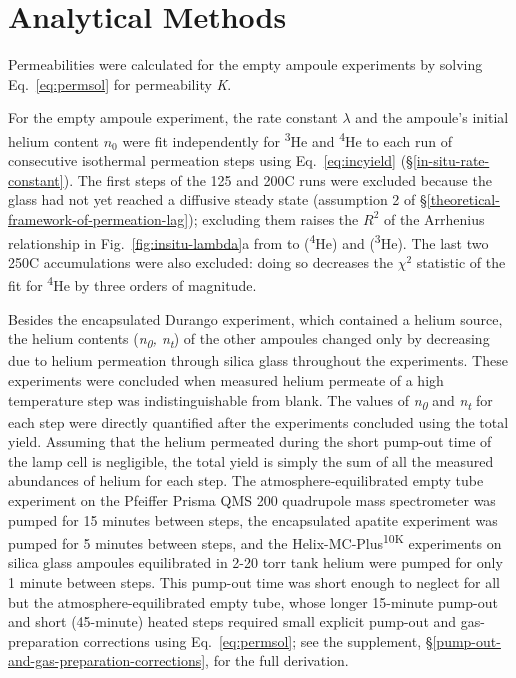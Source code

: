 \section{Analytical Methods}\label{analytical-methods}

Permeabilities were calculated for the empty ampoule experiments by solving Eq.~\eqref{eq:permsol} for permeability \emph{K}.

For the empty ampoule experiment, the rate constant \(\lambda\) and the ampoule's initial helium content \(n_{0}\) were fit independently for \textsuperscript{3}He and \textsuperscript{4}He to each run of consecutive isothermal permeation steps using Eq.~\eqref{eq:incyield} (\S\ref{in-situ-rate-constant}). The first steps of the 125 and 200\textdegree C runs were excluded because the glass had not yet reached a diffusive steady state (assumption 2 of \S\ref{theoretical-framework-of-permeation-lag}); excluding them raises the \(R^{2}\) of the Arrhenius relationship in Fig.~\ref{fig:insitu-lambda}a from \PaperArrRtwoAllFourHe{} to \PaperArrRtwoFourHe{} (\textsuperscript{4}He) and \PaperArrRtwoThreeHe{} (\textsuperscript{3}He). The last two 250\textdegree C accumulations were also excluded: doing so decreases the $\chi^2$ statistic of the fit for \textsuperscript{4}He by three orders of magnitude. 

Besides the encapsulated Durango experiment, which contained a helium source, the helium contents (\emph{n\textsubscript{0}, n\textsubscript{t}}) of the other ampoules changed only by decreasing due to helium permeation through silica glass throughout the experiments. These experiments were concluded when measured helium permeate of a high temperature step was indistinguishable from blank. The values of \emph{n\textsubscript{0}} and \emph{n\textsubscript{t}} for each step were directly quantified after the experiments concluded using the total yield. Assuming that the helium permeated during the short pump-out time of the lamp cell is negligible, the total yield is simply the sum of all the measured abundances of helium for each step. The atmosphere-equilibrated empty tube experiment on the Pfeiffer Prisma QMS 200 quadrupole mass spectrometer was pumped for 15 minutes between steps, the encapsulated apatite experiment was pumped for 5 minutes between steps, and the Helix-MC-Plus\textsuperscript{10K} experiments on silica glass ampoules equilibrated in 2-20 torr tank helium were pumped for only 1 minute between steps. This pump-out time was short enough to neglect for all but the atmosphere-equilibrated empty tube, whose longer 15-minute pump-out and short (45-minute) heated steps required small explicit pump-out and gas-preparation corrections using Eq.~\eqref{eq:permsol}; see the supplement, \S\ref{pump-out-and-gas-preparation-corrections}, for the full derivation.

